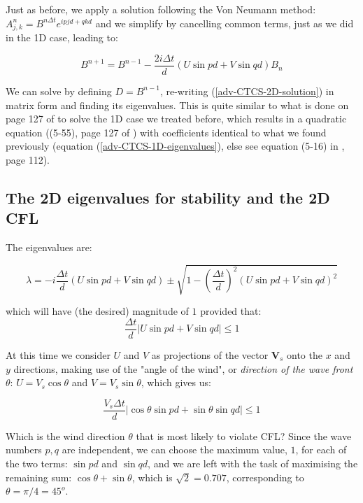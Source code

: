 	Just as before, we apply a solution following the Von Neumann method: ${A_{j,k}^{n}=B^{n \Delta t} e^{i pjd + qkd }}$ and we simplify by cancelling common terms, just as we did in the 1D case, leading to:
	
	\begin{equation}
		B^{n+1}  =  B^{n-1}  - \frac{2 i \Delta t}{d}  \left ( U \sin pd + V \sin qd \right) B_n
		\label{adv-CTCS-2D-solution}
	\end{equation}
	
	We can solve by defining $D=B^{n-1}$, re-writing (\ref{adv-CTCS-2D-solution}) in matrix form and finding its eigenvalues. This is quite similar to what is done on page 127 of \cite{Haltiner-Williams-book} to solve the 1D case we treated before, which results in a quadratic equation ((5-55), page 127 of \cite{Haltiner-Williams-book}) with coefficients identical to what we found previously (equation (\ref{adv-CTCS-1D-eigenvalues}), else see equation (5-16) in \cite{Haltiner-Williams-book}, page 112).

\subsection{The 2D eigenvalues for stability and the 2D CFL}

	The eigenvalues are:
	
	\begin{equation}
		\lambda = -i \frac{ \Delta t}{d}  \left ( U \sin pd + V \sin qd \right) \pm \sqrt { 1-  (\frac{ \Delta t}{d})^2  \left ( U \sin pd + V \sin qd \right) ^2 }
	\end{equation}
	
	which will have (the desired) magnitude of $1$ provided that: 
	\begin{equation}
		\frac{ \Delta t}{d}  \left | U \sin pd + V \sin qd \right | \leq 1
	\end{equation}
	
	At this time we consider $U$ and $V$ as projections of the vector $\mathbf{V}_s$ onto the $x$ and $y$ directions, making use of the "angle of the wind", or \emph{direction of the wave front} $\theta$: $U=V_s \cos \theta$ and $V=V_s \sin \theta$, which gives us:
	
	
	\begin{equation}
		\frac{ V_s\Delta t}{d}  \left | \cos \theta \sin pd + \sin \theta \sin qd \right | \leq 1
	\end{equation}
	
	Which is the wind direction $\theta$ that is most likely to violate CFL? Since the wave numbers $p,q$ are independent, we can choose the maximum value, $1$, for each of the two terms: $\sin pd$ and $\sin qd$, and we are left with the task of maximising the remaining sum: $\cos \theta + \sin \theta$, which is $\sqrt{2}=0.707$, corresponding to $\theta=\pi/4=45^o$.


